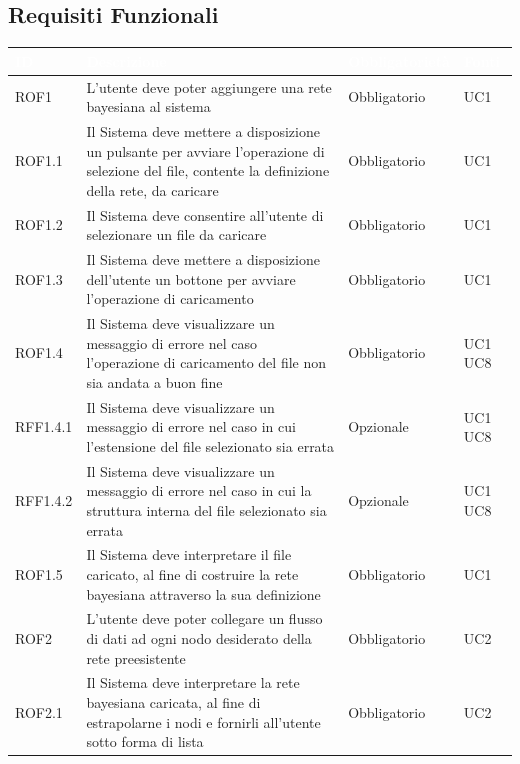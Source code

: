 \newpage
\subsection{Requisiti Funzionali}\label{RF}
\begin{center}
\begin{longtable}[c]{|m{}|m{}|m{}|m{}|}
\hline
\rowcolor{bluelogo}\textbf{\textcolor{white}{ID}} & \textbf{\textcolor{white}{Descrizione}} & \textbf{\textcolor{white}{Obbligatorietà}} & \textbf{\textcolor{white}{Fonti}}\\
\hline \hline
\endhead
ROF1 & L'utente deve poter aggiungere una rete bayesiana al sistema & Obbligatorio & UC1\\
\hline
\rowcolor{grigio}ROF1.1 & Il Sistema deve mettere a disposizione un pulsante per avviare l'operazione di selezione del file, contente la definizione della rete, da caricare & Obbligatorio & UC1\\
\hline
ROF1.2 & Il Sistema deve consentire all'utente di selezionare un file da caricare & Obbligatorio & UC1\\
\hline
\rowcolor{grigio}ROF1.3 & Il Sistema deve mettere a disposizione dell'utente un bottone per avviare l'operazione di caricamento & Obbligatorio & UC1\\
\hline
ROF1.4 & Il Sistema deve visualizzare un messaggio di errore nel caso l'operazione di caricamento del file non sia andata a buon fine & Obbligatorio & UC1 UC8\\
\hline
\rowcolor{grigio}RFF1.4.1 & Il Sistema deve visualizzare un messaggio di errore nel caso in cui l'estensione del file selezionato sia errata & Opzionale & UC1 UC8\\
\hline
RFF1.4.2 & Il Sistema deve visualizzare un messaggio di errore nel caso in cui la struttura interna del file selezionato sia errata & Opzionale & UC1 UC8\\
\hline
\rowcolor{grigio}ROF1.5 & Il Sistema deve interpretare il file caricato, al fine di costruire la rete bayesiana attraverso la sua definizione & Obbligatorio & UC1\\
\hline
ROF2 & L'utente deve poter collegare un flusso di dati ad ogni nodo desiderato della rete preesistente & Obbligatorio & UC2\\
\hline
\rowcolor{grigio}ROF2.1 & Il Sistema deve interpretare la rete bayesiana caricata, al fine di estrapolarne i nodi e fornirli all'utente sotto forma di lista & Obbligatorio & UC2\\

\end{longtable}
\end{center}
